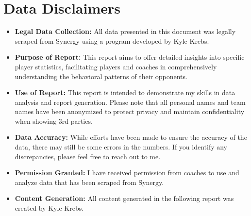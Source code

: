 \documentclass[a4paper,12pt]{article}
\begin{document}
\section*{Data Disclaimers}

\vspace{0.5cm} %

\begin{itemize}[leftmargin=*, label=\textbf{•}]
    \item \textbf{Legal Data Collection:} All data presented in this document was legally scraped from Synergy using a program developed by Kyle Krebs.
    
    \vspace{0.3cm} %

    \item \textbf{Purpose of Report:} This report aims to offer detailed insights into specific player statistics, facilitating players and coaches in comprehensively understanding the behavioral patterns of their opponents.

    \vspace{0.3cm} %
    
    \item \textbf{Use of Report:} This report is intended to demonstrate my skills in data analysis and report generation. Please note that all personal names and team names have been anonymized to protect privacy and maintain confidentiality when showing 3rd parties.
    
    \vspace{0.3cm}
    
    \item \textbf{Data Accuracy:} While efforts have been made to ensure the accuracy of the data, there may still be some errors in the numbers. If you identify any discrepancies, please feel free to reach out to me.
    
    \vspace{0.3cm}
    
    \item \textbf{Permission Granted:} I have received permission from coaches to use and analyze data that has been scraped from Synergy.
    
    \vspace{0.3cm}
    
    \item \textbf{Content Generation:} All content generated in the following report was created by Kyle Krebs.
\end{itemize}
\end{document}
